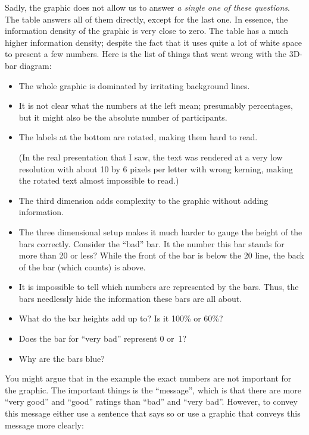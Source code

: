 Sadly, the graphic does not allow us to answer \emph{a single one of these
questions}. The table answers all of them directly, except for the last one. In
essence, the information density of the graphic is very close to zero. The
table has a much higher information density; despite the fact that it uses
quite a lot of white space to present a few numbers. Here is the list of things
that went wrong with the 3D-bar diagram:
%
\begin{itemize}
    \item The whole graphic is dominated by irritating background lines.
    \item It is not clear what the numbers at the left mean; presumably
        percentages, but it might also be the absolute number of
        participants.
    \item The labels at the bottom are rotated, making them hard to read.

        (In the real presentation that I saw, the text was rendered at a very
        low resolution with about 10 by 6 pixels per letter with wrong
        kerning, making the rotated text almost impossible to read.)
    \item The third dimension adds complexity to the graphic without adding
        information.
    \item The three dimensional setup makes it much harder to gauge the
        height of the bars correctly. Consider the ``bad'' bar. It the number
        this bar stands for more than 20 or less? While the front of the bar
        is below the 20 line, the back of the bar (which counts) is above.
    \item It is impossible to tell which numbers are represented by the
        bars. Thus, the bars needlessly hide the information these bars are
        all about.
    \item What do the bar heights add up to? Is it 100\% or 60\%?
    \item Does the bar for ``very bad'' represent 0 or~1?
    \item Why are the bars blue?
\end{itemize}

You might argue that in the example the exact numbers are not important for the
graphic. The important things is the ``message'', which is that there are more
``very good'' and ``good'' ratings than ``bad'' and ``very bad''. However, to
convey this message either use a sentence that says so or use a graphic that
conveys this message more clearly:

